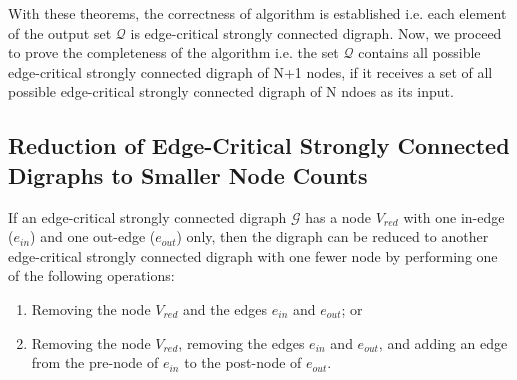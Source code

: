 \documentclass[runningheads]{llncs}
\begin{document}
\noindent With these theorems, the correctness of algorithm is established i.e. each element of the output set $\mathcal{Q}$ is edge-critical strongly connected digraph. Now, we proceed to prove the completeness of the algorithm i.e. the set $\mathcal{Q}$ contains all possible edge-critical strongly connected digraph of N+1 nodes, if it receives a set of all possible edge-critical strongly connected digraph of N ndoes as its input.

\subsection{Reduction of Edge-Critical Strongly Connected Digraphs to Smaller Node Counts}

\begin{theorem}
If an edge-critical strongly connected digraph $\mathcal{G}$ has a node $V_{red}$ with one in-edge ($e_{in}$) and one out-edge ($e_{out}$) only, then the digraph can be reduced to another edge-critical strongly connected digraph with one fewer node by performing one of the following operations:
\begin{enumerate}
    \item Removing the node $V_{red}$ and the edges $e_{in}$ and $e_{out}$; or
    \item Removing the node $V_{red}$, removing the edges $e_{in}$ and $e_{out}$, and adding an edge from the pre-node of $e_{in}$ to the post-node of $e_{out}$.
\end{enumerate}
\end{theorem}
\end{document}
